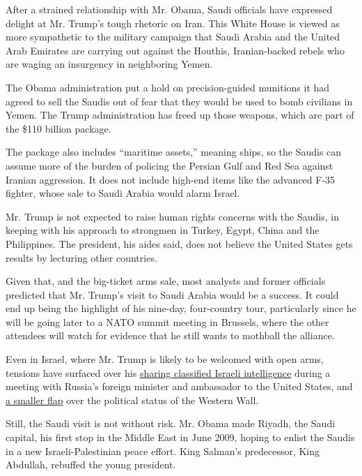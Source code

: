 After a strained relationship with Mr. Obama, Saudi officials have
expressed delight at Mr. Trump's tough rhetoric on Iran. This White
House is viewed as more sympathetic to the military campaign that Saudi
Arabia and the United Arab Emirates are carrying out against the
Houthis, Iranian-backed rebels who are waging an insurgency in
neighboring Yemen.

The Obama administration put a hold on precision-guided munitions it had
agreed to sell the Saudis out of fear that they would be used to bomb
civilians in Yemen. The Trump administration has freed up those weapons,
which are part of the \$110 billion package.

The package also includes ``maritime assets,'' meaning ships, so the
Saudis can assume more of the burden of policing the Persian Gulf and
Red Sea against Iranian aggression. It does not include high-end items
like the advanced F-35 fighter, whose sale to Saudi Arabia would alarm
Israel.

Mr. Trump is not expected to raise human rights concerns with the
Saudis, in keeping with his approach to strongmen in Turkey, Egypt,
China and the Philippines. The president, his aides said, does not
believe the United States gets results by lecturing other countries.

Given that, and the big-ticket arms sale, most analysts and former
officials predicted that Mr. Trump's visit to Saudi Arabia would be a
success. It could end up being the highlight of his nine-day,
four-country tour, particularly since he will be going later to a NATO
summit meeting in Brussels, where the other attendees will watch for
evidence that he still wants to mothball the alliance.

Even in Israel, where Mr. Trump is likely to be welcomed with open arms,
tensions have surfaced over his
\href{https://www.nytimes3xbfgragh.onion/2017/05/16/world/middleeast/israel-trump-classified-intelligence-russia.html}{sharing
classified Israeli intelligence} during a meeting with Russia's foreign
minister and ambassador to the United States, and
\href{https://www.nytimes3xbfgragh.onion/2017/05/15/world/middleeast/emirati-prince-trump.html}{a
smaller flap} over the political status of the Western Wall.

Still, the Saudi visit is not without risk. Mr. Obama made Riyadh, the
Saudi capital, his first stop in the Middle East in June 2009, hoping to
enlist the Saudis in a new Israeli-Palestinian peace effort. King
Salman's predecessor, King Abdullah, rebuffed the young president.

